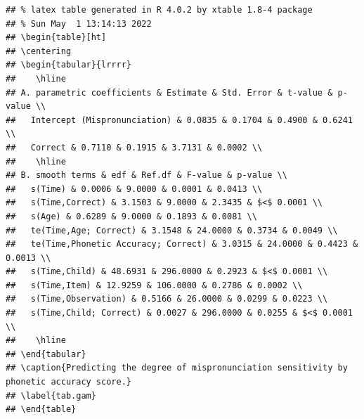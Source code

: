 \documentclass[
]{article}
\begin{document}
\begin{verbatim}
## % latex table generated in R 4.0.2 by xtable 1.8-4 package
## % Sun May  1 13:14:13 2022
## \begin{table}[ht]
## \centering
## \begin{tabular}{lrrrr}
##    \hline
## A. parametric coefficients & Estimate & Std. Error & t-value & p-value \\ 
##   Intercept (Mispronunciation) & 0.0835 & 0.1704 & 0.4900 & 0.6241 \\ 
##   Correct & 0.7110 & 0.1915 & 3.7131 & 0.0002 \\ 
##    \hline
## B. smooth terms & edf & Ref.df & F-value & p-value \\ 
##   s(Time) & 0.0006 & 9.0000 & 0.0001 & 0.0413 \\ 
##   s(Time,Correct) & 3.1503 & 9.0000 & 2.3435 & $<$ 0.0001 \\ 
##   s(Age) & 0.6289 & 9.0000 & 0.1893 & 0.0081 \\ 
##   te(Time,Age; Correct) & 3.1548 & 24.0000 & 0.3734 & 0.0049 \\ 
##   te(Time,Phonetic Accuracy; Correct) & 3.0315 & 24.0000 & 0.4423 & 0.0013 \\ 
##   s(Time,Child) & 48.6931 & 296.0000 & 0.2923 & $<$ 0.0001 \\ 
##   s(Time,Item) & 12.9259 & 106.0000 & 0.2786 & 0.0002 \\ 
##   s(Time,Observation) & 0.5166 & 26.0000 & 0.0299 & 0.0223 \\ 
##   s(Time,Child; Correct) & 0.0027 & 296.0000 & 0.0255 & $<$ 0.0001 \\ 
##    \hline
## \end{tabular}
## \caption{Predicting the degree of mispronunciation sensitivity by phonetic accuracy score.} 
## \label{tab.gam}
## \end{table}
\end{verbatim}
\end{document}
